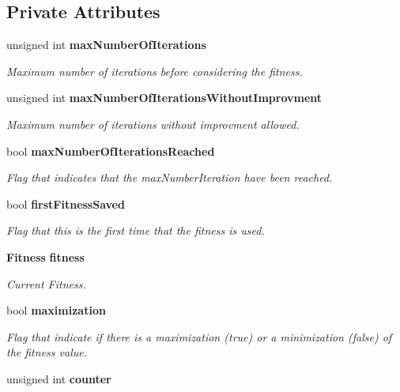 \subsection*{Private Attributes}
\begin{CompactItemize}
\item 
unsigned int {\bf maxNumberOfIterations}\label{classmo_steady_fit_sol_continue_36b43c2a252887ad027165ac32393fe8}

\begin{CompactList}\small\item\em Maximum number of iterations before considering the fitness. \item\end{CompactList}\item 
unsigned int {\bf maxNumberOfIterationsWithoutImprovment}\label{classmo_steady_fit_sol_continue_92a3ea5b6752938b159257f8c6c62580}

\begin{CompactList}\small\item\em Maximum number of iterations without improvment allowed. \item\end{CompactList}\item 
bool {\bf maxNumberOfIterationsReached}\label{classmo_steady_fit_sol_continue_7d88c0eb91b2a12121ba1c3ae9139887}

\begin{CompactList}\small\item\em Flag that indicates that the maxNumberIteration have been reached. \item\end{CompactList}\item 
bool {\bf firstFitnessSaved}\label{classmo_steady_fit_sol_continue_025bf2789e470fdde989eee9121035c3}

\begin{CompactList}\small\item\em Flag that this is the first time that the fitness is used. \item\end{CompactList}\item 
{\bf Fitness} {\bf fitness}\label{classmo_steady_fit_sol_continue_a5c62e7049b36f6e71e92b559568c09e}

\begin{CompactList}\small\item\em Current Fitness. \item\end{CompactList}\item 
bool {\bf maximization}
\begin{CompactList}\small\item\em Flag that indicate if there is a maximization (true) or a minimization (false) of the fitness value. \item\end{CompactList}\item 
unsigned int {\bf counter}\label{classmo_steady_fit_sol_continue_245c9099a2c40dfc4f34b3ff216d13ce}


\end{CompactItemize}
